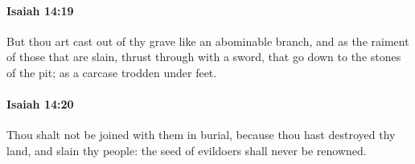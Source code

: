 		\paragraph{Isaiah 14:19} %
			\label{ISAIAH-14-19}

			But thou art cast out of thy grave like an abominable branch, and as the raiment of those that are slain, thrust through with a sword, that go down to the stones of the pit; as a carcase trodden under feet.


		\paragraph{Isaiah 14:20} %
			\label{ISAIAH-14-20}

			Thou shalt not be joined with them in burial, because thou hast destroyed thy land, and slain thy people: the seed of evildoers shall never be renowned.


